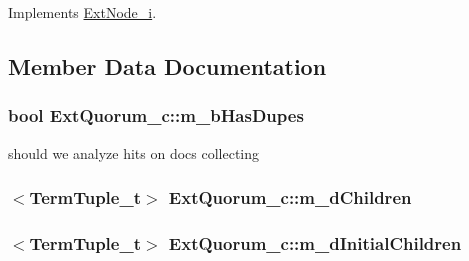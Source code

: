 Implements \hyperlink{classExtNode__i_a73f0d94f75d927ace362079f4794d702}{Ext\-Node\-\_\-i}.



\subsection{Member Data Documentation}
\hypertarget{classExtQuorum__c_aa39189c8613c870930052d4b50ea4ded}{
\subsubsection[{m\-\_\-b\-Has\-Dupes}]{\setlength{\rightskip}{0pt plus 5cm}bool Ext\-Quorum\-\_\-c\-::m\-\_\-b\-Has\-Dupes\hspace{0.3cm}{\ttfamily [private]}}}\label{classExtQuorum__c_aa39189c8613c870930052d4b50ea4ded}


should we analyze hits on docs collecting 

\hypertarget{classExtQuorum__c_a10bf8d557f130030f0eebae0a7bc99c1}{
\subsubsection[{m\-\_\-d\-Children}]{$<${\bf Term\-Tuple\-\_\-t}$>$ Ext\-Quorum\-\_\-c\-::m\-\_\-d\-Children\hspace{0.3cm}{\ttfamily [private]}}}\label{classExtQuorum__c_a10bf8d557f130030f0eebae0a7bc99c1}
\hypertarget{classExtQuorum__c_a4c54e9b1dddd17f5e31cf81eca77474a}{
\subsubsection[{m\-\_\-d\-Initial\-Children}]{$<${\bf Term\-Tuple\-\_\-t}$>$ Ext\-Quorum\-\_\-c\-::m\-\_\-d\-Initial\-Children\hspace{0.3cm}{\ttfamily [private]}}}\label{classExtQuorum__c_a4c54e9b1dddd17f5e31cf81eca77474a}


